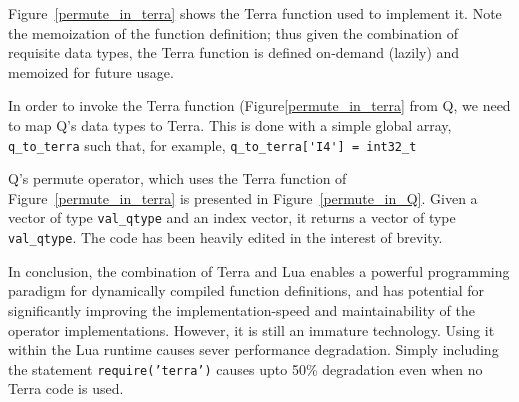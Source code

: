 \begin{figure}
\centering
{}
\end{figure}

Figure~\ref{permute_in_terra} shows the Terra function used to implement it.
Note the memoization of the function definition; thus given the combination of requisite data types, the Terra function is defined on-demand (lazily) and memoized for future usage.

In order to invoke the Terra function (Figure\ref{permute_in_terra} from Q, we
need to map Q's data types to Terra. This is done with a simple global 
array, \verb+q_to_terra+ such that, for example, 
\verb+q_to_terra['I4'] = int32_t+

Q's permute operator, which uses the Terra function of
Figure~\ref{permute_in_terra} 
is presented in Figure~\ref{permute_in_Q}. 
Given a vector of type {\tt val\_qtype} and an index vector, it 
returns a vector of type {\tt val\_qtype}.
The code has been heavily edited in the interest of brevity.

\begin{figure}
\centering
{}
\end{figure}

In conclusion,
the combination of Terra and Lua enables a powerful programming paradigm for dynamically compiled function definitions, and has potential for significantly improving the implementation-speed and maintainability of the operator implementations. 
However, it is
still an immature technology. Using it within the Lua runtime causes sever
performance degradation. Simply including the statement 
{\tt require('terra')} causes upto 50\% degradation even when no Terra code is
used. 

